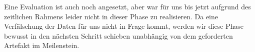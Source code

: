 Eine Evaluation ist auch noch angesetzt, aber war für uns bis jetzt aufgrund des zeitlichen Rahmens leider nicht in dieser Phase zu realisieren. Da eine Verfälschung der Daten für uns nicht in Frage kommt, werden wir diese Phase bewusst in den nächsten Schritt schieben unabhängig von dem geforderten Artefakt im Meilenstein. 
